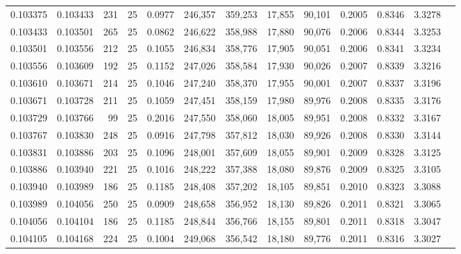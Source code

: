 \begin{tabular}{rrrrrrrrrrrrr}
0.103375 & 0.103433 &   231 &  25 &                                     0.0977 & 246,357 & 359,253 &  17,855 &  90,101 & 0.2005 & 0.8346 & 3.3278 \\
0.103433 & 0.103501 &   265 &  25 &                                     0.0862 & 246,622 & 358,988 &  17,880 &  90,076 & 0.2006 & 0.8344 & 3.3253 \\
0.103501 & 0.103556 &   212 &  25 &                                     0.1055 & 246,834 & 358,776 &  17,905 &  90,051 & 0.2006 & 0.8341 & 3.3234 \\
0.103556 & 0.103609 &   192 &  25 &                                     0.1152 & 247,026 & 358,584 &  17,930 &  90,026 & 0.2007 & 0.8339 & 3.3216 \\
0.103610 & 0.103671 &   214 &  25 &                                     0.1046 & 247,240 & 358,370 &  17,955 &  90,001 & 0.2007 & 0.8337 & 3.3196 \\
0.103671 & 0.103728 &   211 &  25 &                                     0.1059 & 247,451 & 358,159 &  17,980 &  89,976 & 0.2008 & 0.8335 & 3.3176 \\
0.103729 & 0.103766 &    99 &  25 &                                     0.2016 & 247,550 & 358,060 &  18,005 &  89,951 & 0.2008 & 0.8332 & 3.3167 \\
0.103767 & 0.103830 &   248 &  25 &                                     0.0916 & 247,798 & 357,812 &  18,030 &  89,926 & 0.2008 & 0.8330 & 3.3144 \\
0.103831 & 0.103886 &   203 &  25 &                                     0.1096 & 248,001 & 357,609 &  18,055 &  89,901 & 0.2009 & 0.8328 & 3.3125 \\
0.103886 & 0.103940 &   221 &  25 &                                     0.1016 & 248,222 & 357,388 &  18,080 &  89,876 & 0.2009 & 0.8325 & 3.3105 \\
0.103940 & 0.103989 &   186 &  25 &                                     0.1185 & 248,408 & 357,202 &  18,105 &  89,851 & 0.2010 & 0.8323 & 3.3088 \\
0.103989 & 0.104056 &   250 &  25 &                                     0.0909 & 248,658 & 356,952 &  18,130 &  89,826 & 0.2011 & 0.8321 & 3.3065 \\
0.104056 & 0.104104 &   186 &  25 &                                     0.1185 & 248,844 & 356,766 &  18,155 &  89,801 & 0.2011 & 0.8318 & 3.3047 \\
0.104105 & 0.104168 &   224 &  25 &                                     0.1004 & 249,068 & 356,542 &  18,180 &  89,776 & 0.2011 & 0.8316 & 3.3027 \\

\end{tabular}
